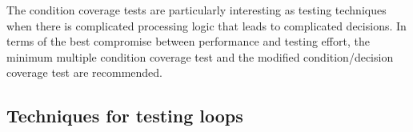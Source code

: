 



	The condition coverage tests are particularly interesting as testing techniques when there is complicated processing logic that leads to complicated decisions. In terms of the best compromise between performance and testing effort, the minimum multiple condition coverage test and the modified condition/decision coverage test are recommended.

	\subsection{Techniques for testing loops}

